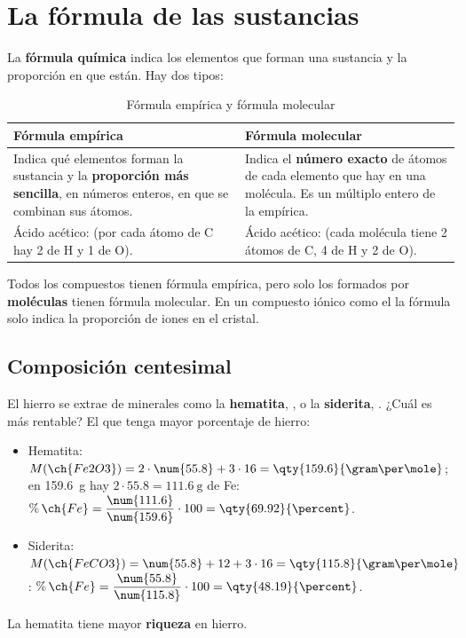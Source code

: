 \section{La fórmula de las sustancias}\label{sec:ud1-formula}

La \textbf{fórmula química} indica los elementos que forman una sustancia y la proporción en que están. Hay dos tipos:

\begin{table}[H]
    \centering
    \caption{Fórmula empírica y fórmula molecular}
    \vspace{-5pt}
    \begin{tabular}{@{}L{7cm}L{7cm}@{}}
        \toprule
        \textbf{Fórmula empírica} & \textbf{Fórmula molecular} \\
        \midrule
        Indica qué elementos forman la sustancia y la \textbf{proporción más sencilla}, en números enteros, en que se combinan
        sus átomos. &
        Indica el \textbf{número exacto} de átomos de cada elemento que hay en una molécula. Es un múltiplo entero de la
        empírica. \\[3pt]
        Ácido acético:  (por cada átomo de C hay 2 de H y 1 de O). &
        Ácido acético:  (cada molécula tiene 2 átomos de C, 4 de H y 2 de O). \\
        \bottomrule
    \end{tabular}
    \label{tab:ud1-formulas}
\end{table}

Todos los compuestos tienen fórmula empírica, pero solo los formados por \textbf{moléculas} tienen fórmula molecular. En un
compuesto iónico como el  la fórmula solo indica la proporción de iones en el cristal.

\subsection{Composición centesimal}

El hierro se extrae de minerales como la \textbf{hematita}, , o la \textbf{siderita}, . ¿Cuál es más
rentable? El que tenga mayor porcentaje de hierro:
\begin{itemize}
    \item Hematita: \(M(\ch{Fe2O3}) = 2 \cdot \num{55.8} + 3 \cdot 16 = \qty{159.6}{\gram\per\mole}\); en \qty{159.6}{\gram} hay
    \(2 \cdot \num{55.8} = \qty{111.6}{\gram}\) de Fe: \(\%\,\ch{Fe} = \dfrac{\num{111.6}}{\num{159.6}} \cdot 100 = \qty{69.92}{\percent}\).
    \item Siderita: \(M(\ch{FeCO3}) = \num{55.8} + 12 + 3 \cdot 16 = \qty{115.8}{\gram\per\mole}\):
    \(\%\,\ch{Fe} = \dfrac{\num{55.8}}{\num{115.8}} \cdot 100 = \qty{48.19}{\percent}\).
\end{itemize}
La hematita tiene mayor \textbf{riqueza} en hierro.

